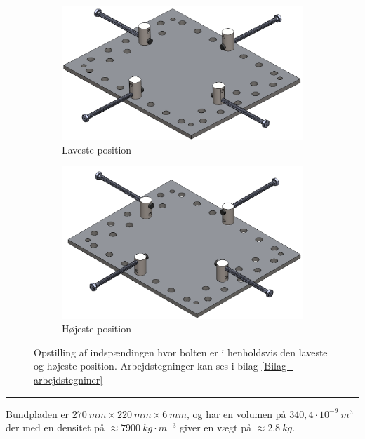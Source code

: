 \begin{figure}[H]
    \centering
    \begin{subfigure}[b]{0.48\textwidth}
    \centering
         \includegraphics[width=0.9\linewidth]{Sections/6 Detaljeløsning/Media/Indspænding lav.png}
     \caption{Laveste position}
      \label{fig: indspænding lav}
    \end{subfigure} 
    \begin{subfigure}[b]{0.48\textwidth}
    \centering
        \includegraphics[width=0.9\linewidth]{Sections/6 Detaljeløsning/Media/Indspænding høj.png}
     \caption{Højeste position}
      \label{fig: indspænding høj}
    \end{subfigure}
    \caption{Opstilling af indspændingen hvor bolten er i henholdsvis den laveste og højeste position. Arbejdstegninger kan ses i bilag \ref{Bilag - arbejdstegniner}}
    \label{fig: indspænding}
\end{figure} \plainbreak{-.5}

Bundpladen er $\SI{270}{mm} \times \SI{220}{mm} \times \SI{6}{mm}$, og har en volumen på  $ 340,4 \cdot 10^{-9} \SI{}{m^3}$ der med en densitet på $\approx \SI{7900}{kg \cdot m^{-3}}$ giver en vægt på $\approx \SI{2,8}{kg}$. 